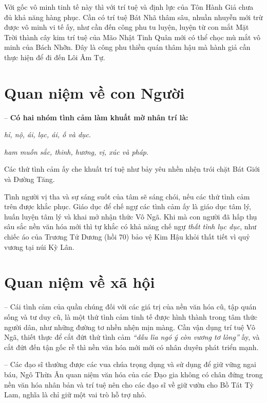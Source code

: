 Với gốc vô minh tinh tế này thì với trí tuệ và định lực của Tôn Hành Giả chưa đủ khả năng hàng phục. Cần có trí tuệ Bát Nhã thâm sâu, nhuần nhuyễn mới trừ được vô minh vi tế ấy, như cần đến công phu tu luyện, luyện từ con mắt Mặt Trời thành cây kim trí tuệ của Mão Nhật Tinh Quân mới có thể chọc mù mắt vô minh của Bách Nhỡn. Đây là công phu thiền quán thâm hậu mà hành giả cần thực hiện để đi đến Lôi Âm Tự.

\section{Quan niệm về con Người} %
\label{sec:72_73_con_nguoi}

-- {\bf Có hai nhóm tình cảm làm khuất mờ nhân trí là:}

\begin{description}[leftmargin=!,labelwidth=\widthof{\bfseries Thất tình:}]
    \item[Thất tình:] \emph{hỉ, nộ, ái, lạc, ái, ố và dục}.

    \item[Lục dục:] \emph{ham muốn sắc, thinh, hương, vị, xúc và pháp}.
\end{description}

Các thứ tình cảm ấy che khuất trí tuệ như bảy yêu nhền nhện trói chặt Bát Giới và Đường Tăng.

Tình người vị tha và sự sáng suốt của tâm sẽ sáng chói, nếu các thứ tình cảm trên được khắc phục. Giáo dục để chế ngự các tình cảm ấy là giáo dục tâm lý, huấn luyện tâm lý và khai mở nhận thức Vô Ngã. Khi mà con người đã hấp thụ sâu sắc nền văn hóa mới thì tự khắc có khả năng chế ngự \emph{thất tình lục dục}, như chiếc áo của Trương Tử Dương (hồi 70) bảo vệ Kim Hậu khỏi thất tiết vì quỷ vương tại núi Kỳ Lân.

\section{Quan niệm về xã hội} %
\label{sec:72_73_xa_hoi}

-- Cái tình cảm của quần chúng đối với các giá trị của nền văn hóa cũ, tập quán sống và tư duy cũ, là một thứ tình cảm tinh tế được hình thành trong tâm thức người dân, như những đường tơ nhền nhện mịn màng. Cần vận dụng trí tuệ Vô Ngã, thiết thực để cắt đứt thứ tình cảm \emph{``dẫu lìa ngó ý còn vương tơ lòng''} ấy, và cắt đứt đến tận gốc rễ thì nền văn hóa mới mới có nhân duyên phát triển mạnh.

-- Các đạo sĩ thường được các vua chúa trọng dụng và sử dụng để giữ vững ngai báu, Ngô Thừa Ân quan niệm văn hóa của các Đạo gia không có chân đứng trong nền văn hóa nhân bản và trí tuệ nên cho các đạo sĩ về giữ vườn cho Bồ Tát Tỳ Lam, nghĩa là chỉ giữ một vai trò hỗ trợ nhỏ.
